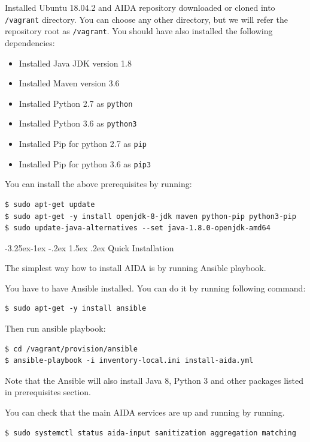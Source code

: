 \documentclass[a4paper]{article} %
\makeatletter
\renewcommand\subsection{\@startsection{subsection}{2}{\z@}%
                   {-3.25ex\@plus -1ex \@minus -.2ex}%
                   {1.5ex \@plus .2ex}%
                   {\normalfont\sffamily\large\bfseries\color{projectcolor}}}
\makeatother
\begin{document}
Installed Ubuntu 18.04.2 and AIDA repository downloaded or cloned into \texttt{/vagrant} directory. You can choose any other directory, but we will refer the repository root as \texttt{/vagrant}. You should have also installed the following dependencies:
\begin{itemize}[nolistsep,noitemsep]
    \item Installed Java JDK version 1.8
    \item Installed Maven version 3.6
    \item Installed Python 2.7 as \texttt{python}
    \item Installed Python 3.6 as \texttt{python3}
    \item Installed Pip for python 2.7 as \texttt{pip}
    \item Installed Pip for python 3.6 as \texttt{pip3}
\end{itemize}
You can install the above prerequisites by running:
\begin{lstlisting}
$ sudo apt-get update
$ sudo apt-get -y install openjdk-8-jdk maven python-pip python3-pip
$ sudo update-java-alternatives --set java-1.8.0-openjdk-amd64
\end{lstlisting}

\subsection{Quick Installation}

The simplest way how to install AIDA is by running Ansible playbook.

You have to have Ansible installed. You can do it by running following command:

\begin{lstlisting}
$ sudo apt-get -y install ansible
\end{lstlisting}

Then run ansible playbook:

\begin{lstlisting}
$ cd /vagrant/provision/ansible
$ ansible-playbook -i inventory-local.ini install-aida.yml
\end{lstlisting}

Note that the Ansible will also install Java 8, Python 3 and other packages listed in prerequisites section.

You can check that the main AIDA services are up and running by running.
\begin{lstlisting}
$ sudo systemctl status aida-input sanitization aggregation matching
\end{lstlisting}
\end{document}
